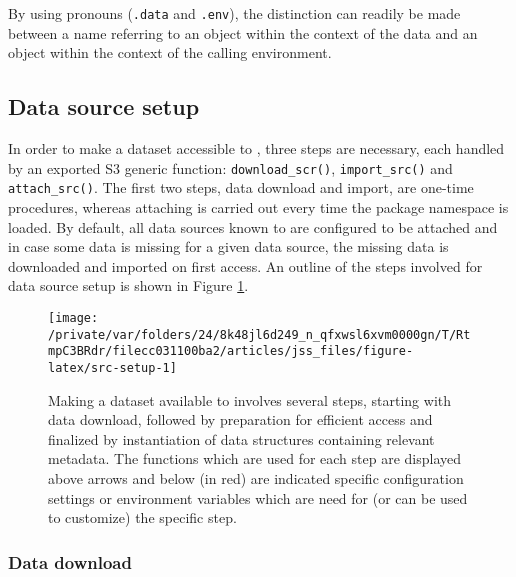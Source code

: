 \documentclass[
  notitle,
  nojss,
  noheadings]{jss}
\begin{document}
By using  pronouns (\texttt{.data} and \texttt{.env}), the
distinction can readily be made between a name referring to an object
within the context of the data and an object within the context of the
calling environment.

\hypertarget{data-source-setup}{%
\subsection{Data source setup}\label{data-source-setup}}

In order to make a dataset accessible to , three steps are
necessary, each handled by an exported S3 generic function:
\texttt{download\_scr()}, \texttt{import\_src()} and
\texttt{attach\_src()}. The first two steps, data download and import,
are one-time procedures, whereas attaching is carried out every time the
package namespace is loaded. By default, all data sources known to
 are configured to be attached and in case some data is
missing for a given data source, the missing data is downloaded and
imported on first access. An outline of the steps involved for data
source setup is shown in Figure \ref{fig:src-setup}.

\begin{CodeChunk}
\begin{figure}

{\centering \texttt{[image: /private/var/folders/24/8k48jl6d249\_n\_qfxwsl6xvm0000gn/T/RtmpC3BRdr/filecc031100ba2/articles/jss\_files/figure-latex/src-setup-1]} 

}

\caption[Making a dataset available to  involves several steps, starting with data download, followed by preparation for efficient access and finalized by instantiation of data structures containing relevant metadata]{Making a dataset available to  involves several steps, starting with data download, followed by preparation for efficient access and finalized by instantiation of data structures containing relevant metadata. The functions which are used for each step are displayed above arrows and below (in red) are indicated specific configuration settings or environment variables which are need for (or can be used to customize) the specific step.}\label{fig:src-setup}
\end{figure}
\end{CodeChunk}

\hypertarget{data-download}{%
\subsubsection{Data download}\label{data-download}}
\end{document}
